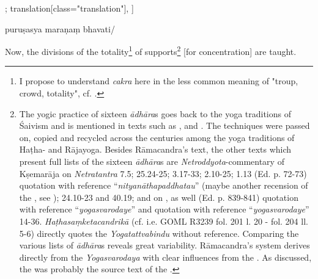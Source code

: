 \begin{alignment}[
  texts=edition[class="edition"];
  translation[class="translation"],
  ]
\begin{edition}
\begin{prose}[p30_01]
puruṣasya maraṇaṃ
bhavati/
\end{prose}
  \end{edition}
  \begin{translation}
    \begin{tlate}[p30_01]
      \noindent
      Now, the divisions of the totality\footnote{I propose to understand \textit{cakra} here in the less common meaning of "troup, crowd, totality", cf. \citeauthor[vol. 2, 1958:209]{petersburger}.} of supports\footnote{The yogic practice of sixteen \textit{ādhāra}s goes back to the yoga traditions of Śaivism and is mentioned in texts such as ,  and . The techniques were passed on, copied and recycled across the centuries among the yoga traditions of Haṭha- and Rājayoga. Besides Rāmacandra's text, the other texts which present full lists of the sixteen \textit{ādhāra}s are \textit{Netroddyota}-commentary of Kṣemarāja on \textit{Netratantra} 7.5;  25.24-25;  3.17-33;  2.10-25;  1.13 (Ed. p. 72-73) quotation with reference ``\textit{nityanāthapaddhatau}'' (maybe another recension of the , see \citeauthor[2023:149]{shivayogapradipika});  24.10-23 and 40.19; and  on , as well  (Ed. p. 839-841) quotation with reference ``\textit{yogasvarodaye}'' and  quotation with reference ``\textit{yogasvarodaye}'' 14-36. \textit{Haṭhasaṃketacandrikā} (cf. i.e. GOML R3239 fol. 201 l. 20 - fol. 204 ll. 5-6) directly quotes the \textit{Yogatattvabindu} without reference. Comparing the various lists of \textit{ādhāra}s reveals great variability. Rāmacandra's system derives directly from the \textit{Yogasvarodaya} with clear influences from the . As \citeauthor[2023:151]{shivayogapradipika} discussed, the  was probably the source text of the .} [for concentration] are taught.%

\end{tlate}
\end{translation}
\end{alignment}
